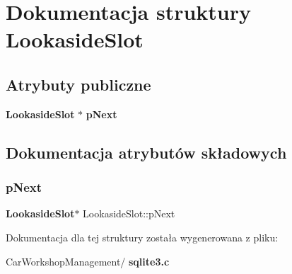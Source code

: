 \section{Dokumentacja struktury Lookaside\+Slot}
\label{struct_lookaside_slot}
\subsection*{Atrybuty publiczne}
\begin{DoxyCompactItemize}
\item 
\textbf{ Lookaside\+Slot} $\ast$ \textbf{ p\+Next}
\end{DoxyCompactItemize}


\subsection{Dokumentacja atrybutów składowych}
\mbox{\label{struct_lookaside_slot_a3c3dd4a770ded51a68e8a651eba40f66}} 
\subsubsection{pNext}
{\footnotesize\ttfamily \textbf{ Lookaside\+Slot}$\ast$ Lookaside\+Slot\+::p\+Next}



Dokumentacja dla tej struktury została wygenerowana z pliku\+:\begin{DoxyCompactItemize}
\item 
Car\+Workshop\+Management/\textbf{ sqlite3.\+c}\end{DoxyCompactItemize}
